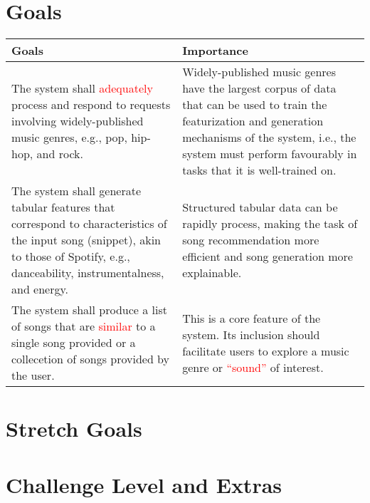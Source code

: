 \documentclass{article}
\begin{document}
\section{Goals}
\begin{table}[h]
    \centering
    \begin{tabular}{|| p{} | p{} ||}
        \hline
        \textbf{Goals} & \textbf{Importance} \\
        \hline
        The system shall \textcolor{red}{adequately} process and respond to 
        requests involving widely-published music genres, e.g., pop, hip-hop, 
        and rock. & Widely-published music genres have the largest corpus of 
        data that can be used to train the featurization and generation 
        mechanisms of the system, i.e., the system must perform favourably in 
        tasks that it is well-trained on. \\
        \hline
        The system shall generate tabular features that correspond to characteristics 
        of the input song (snippet), akin to those of Spotify, e.g., danceability, 
        instrumentalness, and energy. & Structured tabular data can be rapidly process, 
        making the task of song recommendation more efficient and song generation 
        more explainable. \\
        \hline
        The system shall produce a list of songs that are \textcolor{red}{similar} 
        to a single song provided or a collecetion of songs provided by the user. & 
        This is a core feature of the system. Its inclusion should facilitate users 
        to explore a music genre or \textcolor{red}{``sound''} of interest. \\
        \hline
    \end{tabular}
\end{table}

\section{Stretch Goals}

\section{Challenge Level and Extras}

\end{document}
